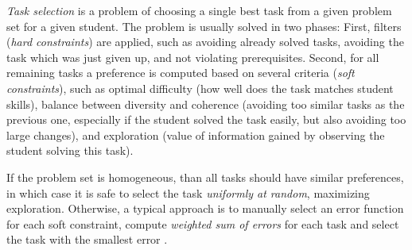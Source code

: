 \emph{Task selection} is a problem of choosing a single best task
from a given problem set for a given student.
The problem is usually solved in two phases:
First, filters (\emph{hard constraints}) are applied,
such as avoiding already solved
tasks, avoiding the task which was just given up, %
and not violating prerequisites.  %
Second, for all remaining tasks a preference is computed based on several criteria
(\emph{soft constraints}), such as
optimal difficulty (how well does the task matches student skills),
balance between diversity and coherence
(avoiding too similar tasks as the previous one, especially if the student
solved the task easily, but also avoiding too large changes),
and exploration (value of information gained by observing the student solving this task).

If the problem set is homogeneous, than all tasks should have similar preferences,
in which case it is safe to select the task \emph{uniformly at random},
maximizing exploration.
Otherwise, a typical approach is to manually select an error function for each
soft constraint, compute \emph{weighted sum of errors} for each task and
select the task with the smallest error \cite{alg.geography}.



